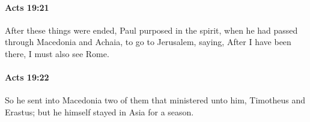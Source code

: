 		\paragraph{Acts 19:21} %
			\label{ACTS-19-21}

			After these things were ended, Paul purposed in the spirit, when he had passed through Macedonia and Achaia, to go to Jerusalem, saying, After I have been there, I must also see Rome.

			\begin{framed}
			\scriptsize
				\begin{compactdesc}
					\item[SBLG] 
				\end{compactdesc}
			\end{framed}

		\paragraph{Acts 19:22} %
			\label{ACTS-19-22}

			So he sent into Macedonia two of them that ministered unto him, Timotheus and Erastus; but he himself stayed in Asia for a season.

